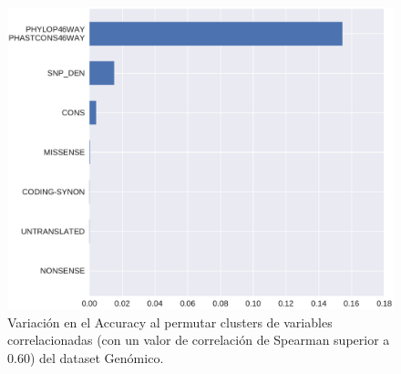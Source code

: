 \begin{figure}[H]
    \centering
    \includegraphics[scale=0.45]{documents/latex/figures/3/genomic/genomic_importance_cluster.pdf}
    \caption{Variación en el Accuracy al permutar clusters de variables correlacionadas (con un valor de correlación de Spearman superior a 0.60) del dataset Genómico.}
    \label{fig:importance_genomic_cluster}
\end{figure}

\newpage

